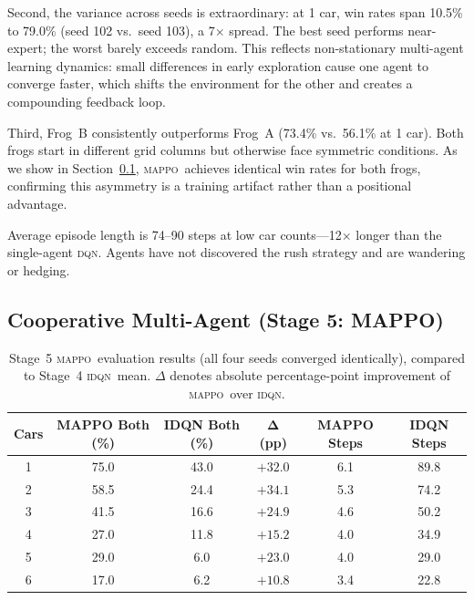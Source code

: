 \documentclass[12pt]{article}
\newcommand{\MAPPO}{\textsc{mappo}}
\newcommand{\IDQN}{\textsc{idqn}}
\newcommand{\DQN}{\textsc{dqn}}
\begin{document}
Second, the variance across seeds is extraordinary: at 1 car, win rates span
10.5\% to 79.0\% (seed 102 vs.\ seed 103), a 7$\times$ spread.  The best
seed performs near-expert; the worst barely exceeds random.  This reflects
non-stationary multi-agent learning dynamics: small differences in early
exploration cause one agent to converge faster, which shifts the environment
for the other and creates a compounding feedback loop.

Third, Frog~B consistently outperforms Frog~A (73.4\% vs.\ 56.1\% at 1 car).
Both frogs start in different grid columns but otherwise face symmetric
conditions.  As we show in Section~\ref{sec:results_mappo}, \MAPPO\ achieves
identical win rates for both frogs, confirming this asymmetry is a training
artifact rather than a positional advantage.

Average episode length is 74--90 steps at low car counts—12$\times$ longer
than the single-agent \DQN.  Agents have not discovered the rush strategy and
are wandering or hedging.

\subsection{Cooperative Multi-Agent (Stage 5: MAPPO)}
\label{sec:results_mappo}

\begin{table}[h]
\centering
\caption{Stage~5 \MAPPO\ evaluation results (all four seeds converged
  identically), compared to Stage~4 \IDQN\ mean.  $\Delta$ denotes absolute
  percentage-point improvement of \MAPPO\ over \IDQN.}
\label{tab:mappo_eval}
\renewcommand{\arraystretch}{1.2}
\begin{tabular}{cccccc}
\toprule
\textbf{Cars}
  & \textbf{MAPPO Both (\%)}
  & \textbf{IDQN Both (\%)}
  & $\boldsymbol{\Delta}$\textbf{ (pp)}
  & \textbf{MAPPO Steps}
  & \textbf{IDQN Steps} \\
\midrule
1 & 75.0 & 43.0 & $+32.0$ & 6.1  & 89.8 \\
2 & 58.5 & 24.4 & $+34.1$ & 5.3  & 74.2 \\
3 & 41.5 & 16.6 & $+24.9$ & 4.6  & 50.2 \\
4 & 27.0 & 11.8 & $+15.2$ & 4.0  & 34.9 \\
5 & 29.0 & 6.0  & $+23.0$ & 4.0  & 29.0 \\
6 & 17.0 & 6.2  & $+10.8$ & 3.4  & 22.8 \\
\bottomrule
\end{tabular}
\end{table}
\end{document}
